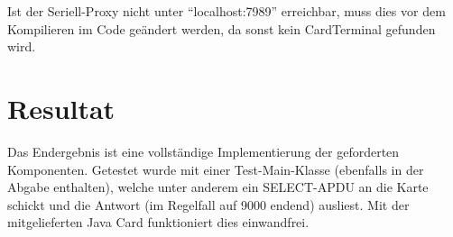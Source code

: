 \documentclass[paper=a4, fontsize=11pt]{scrartcl}
\begin{document}
Ist der Seriell-Proxy nicht unter \enquote{localhost:7989} erreichbar, muss dies vor dem Kompilieren im Code geändert werden, da sonst kein CardTerminal gefunden wird.


\section{Resultat}
Das Endergebnis ist eine vollständige Implementierung der geforderten Komponenten. Getestet wurde mit einer Test-Main-Klasse (ebenfalls in der Abgabe enthalten), welche unter anderem ein SELECT-APDU an die Karte schickt und die Antwort (im Regelfall auf 9000 endend) ausliest. Mit der mitgelieferten Java Card funktioniert dies  einwandfrei.
\end{document}
